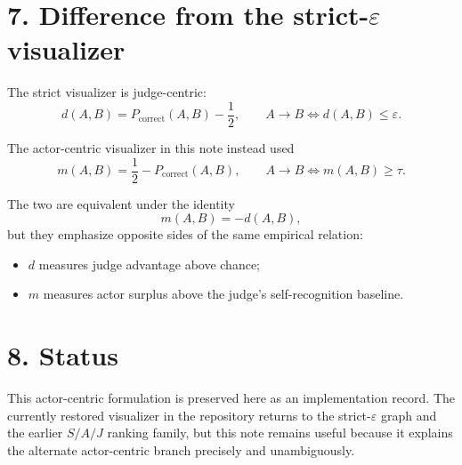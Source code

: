 \documentclass[11pt]{article}
\begin{document}
\section*{7. Difference from the strict-\(\varepsilon\) visualizer}
The strict visualizer is judge-centric:
\[
d(A,B)=P_{\mathrm{correct}}(A,B)-\frac12,
\qquad
A \to B \iff d(A,B)\le \varepsilon.
\]

The actor-centric visualizer in this note instead used
\[
m(A,B)=\frac12-P_{\mathrm{correct}}(A,B),
\qquad
A \to B \iff m(A,B)\ge \tau.
\]

The two are equivalent under the identity
\[
m(A,B)=-d(A,B),
\]
but they emphasize opposite sides of the same empirical relation:
\begin{itemize}
  \item \(d\) measures judge advantage above chance;
  \item \(m\) measures actor surplus above the judge's self-recognition baseline.
\end{itemize}

\section*{8. Status}
This actor-centric formulation is preserved here as an implementation record. The currently restored visualizer in the repository returns to the strict-\(\varepsilon\) graph and the earlier \(S/A/J\) ranking family, but this note remains useful because it explains the alternate actor-centric branch precisely and unambiguously.
\end{document}

